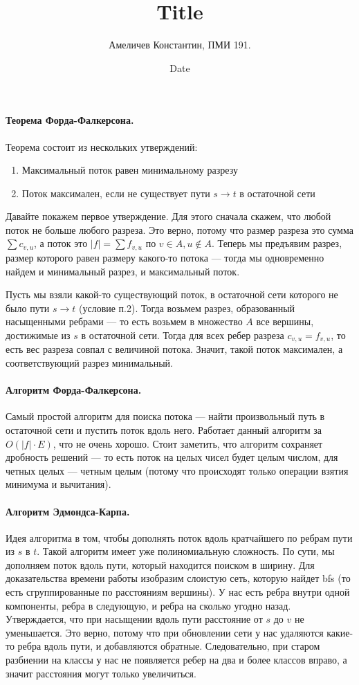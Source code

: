 \documentclass[12pt]{article}
\title{Title}
\author{Амеличев Константин, ПМИ 191.}
\date{Date}
\begin{document}
\paragraph{Теорема Форда-Фалкерсона.} Теорема состоит из нескольких утверждений:
\begin{enumerate}
    \item Максимальный поток равен минимальному разрезу
    \item Поток максимален, если не существует пути $s \rightarrow t$ в остаточной сети
\end{enumerate}

Давайте покажем первое утверждение. Для этого сначала скажем, что любой поток не больше любого разреза. Это верно, потому что размер разреза это сумма $\sum c_{v, u}$, а поток это $|f| = \sum f_{v, u}$ по $v \in A, u \notin A$. Теперь мы предъявим разрез, размер которого равен размеру какого-то потока --- тогда мы одновременно найдем и минимальный разрез, и максимальный поток.

Пусть мы взяли какой-то существующий поток, в остаточной сети которого не было пути $s \rightarrow t$ (условие п.2). Тогда возьмем разрез, образованный насыщенными ребрами --- то есть возьмем в множество $A$ все вершины, достижимые из $s$ в остаточной сети. Тогда для всех ребер разреза $c_{v, u} = f_{v, u}$, то есть вес разреза совпал с величиной потока. Значит, такой поток максимален, а соответствующий разрез минимальный.

\paragraph{Алгоритм Форда-Фалкерсона.} Самый простой алгоритм для поиска потока --- найти произвольный путь в остаточной сети и пустить поток вдоль него. Работает данный алгоритм за $O(|f| \cdot E)$, что не очень хорошо. Стоит заметить, что алгоритм сохраняет дробность решений --- то есть поток на целых чисел будет целым числом, для четных целых --- четным целым (потому что происходят только операции взятия минимума и вычитания).

\paragraph{Алгоритм Эдмондса-Карпа.} Идея алгоритма в том, чтобы дополнять поток вдоль кратчайшего по ребрам пути из $s$ в $t$. Такой алгоритм имеет уже полиномиальную сложность. По сути, мы дополняем поток вдоль пути, который находится поиском в ширину. Для доказательства времени работы изобразим слоистую сеть, которую найдет bfs (то есть сгруппированные по расстояниям вершины). У нас есть ребра внутри одной компоненты, ребра в следующую, и ребра на сколько угодно назад. Утверждается, что при насыщении вдоль пути расстояние от $s$ до $v$ не уменьшается. Это верно, потому что при обновлении сети у нас удаляются какие-то ребра вдоль пути, и добавляются обратные. Следовательно, при старом разбиении на классы у нас не появляется ребер на два и более классов вправо, а значит расстояния могут только увеличиться.
\end{document}
